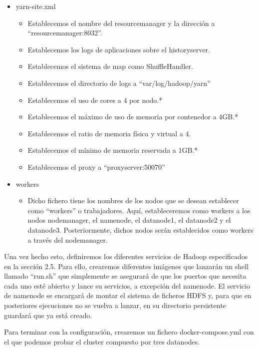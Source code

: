 \begin{itemize}
	\item yarn-site.xml
	\begin{itemize}
		\item Establecemos el nombre del resourcemanager y la dirección a “resourcemanager:8032”.
		\item Establecemos los logs de aplicaciones sobre el historyserver.
		\item Establecemos el sistema de map como ShuffleHandler.
		\item Establecemos el directorio de logs a “var/log/hadoop/yarn”
		\item Establecemos el uso de cores a 4 por nodo.*
		\item Establecemos el máximo de uso de memoria por contenedor a 4GB.*
		\item Establecemos el ratio de memoria física y virtual a 4.
		\item Establecemos el mínimo de memoria reservada a 1GB.*
		\item Establecemos el proxy a “proxyserver:50070” 
	\end{itemize}
	
	\item workers
	\begin{itemize}
		\item Dicho fichero tiene los nombres de los nodos que se desean establecer como “workers” o trabajadores. Aquí, estableceremos como workers a los nodos  nodemanager, el namenode, el datanode1, el datanode2 y el datanode3. Posteriormente, dichos nodos serán establecidos como workers a través del nodemanager.
	\end{itemize}
\end{itemize}

Una vez hecho esto, definiremos los diferentes servicios de Hadoop especificados en la sección 2.5. Para ello, crearemos diferentes imágenes que lanzarán un shell llamado “run.sh” que simplemente se asegurará de que los puertos que necesita cada uno esté abierto y lance su servicios, a excepción del namenode. El servicio de namenode se encargará de montar el sistema de ficheros HDFS y, para que en posteriores ejecuciones no se vuelva a lanzar, en su directorio persistente guardará que ya está creado.\par

Para terminar con la configuración, crearemos un fichero docker-compose.yml con el que podemos probar el cluster compuesto por tres datanodes.\par

